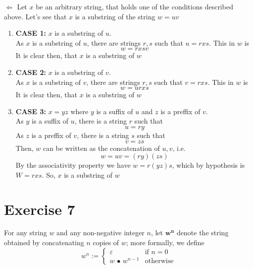 \documentclass[12pt]{article}
\begin{document}
$\Leftarrow$
Let $x$ be an arbitrary string, that holds one of the conditions described above. Let's see that $x$ is a substring of the string $w=uv$
\begin{enumerate}
    \item \textbf{CASE 1:} $x$ is a substring of $u$. \\
        As $x$ is a substring of $u$, there are strings $r, s$ such that $u=rxs$. This in $w$ is
        \begin{equation*}
            w = rxsv
        \end{equation*}
        It is clear then, that $x$ is a substring of $w$

    \item \textbf{CASE 2:} $x$ is a substring of $v$. \\
        As $x$ is a substring of $v$, there are strings $r, s$ such that $v=rxs$. This in $w$ is
        \begin{equation*}
            w = urxs
        \end{equation*}
        It is clear then, that $x$ is a substring of $w$

    \item \textbf{CASE 3:} $x=yz$ where $y$ is a suffix of $u$ and $z$ is a preffix of $v$. \\
        As $y$ is a suffix of $u$, there is a string $r$ such that
        \begin{equation*}
            u=ry
        \end{equation*}
        As $z$ is a preffix of $v$, there is a string $s$ such that
        \begin{equation*}
            v=zs
        \end{equation*}
        Then, $w$ can be written as the concatenation of $u, v$, i.e.
        \begin{equation*}
            w = uv = (ry)(zs)
        \end{equation*}
        By the associativity property we have $w=r(yz)s$, which by hypothesis is $W=rxs$. So, $x$ is a substring of $w$
\end{enumerate}

\renewcommand{\thesubsection}{\thesection.\alph{subsection}}

\section{Exercise 7}
For any string $w$ and any non-negative integer $n$, let $\mathbf{w^n}$ denote the string obtained by
concatenating $n$ copies of $w$; more formally, we define
\[
w^n :=
\begin{cases}
    \varepsilon & \text{if } n=0 \\
    w \text{ • } w^{n-1} & \text{otherwise}
\end{cases}
\]
\end{document}
